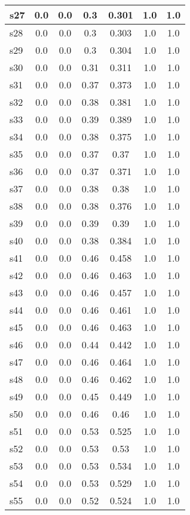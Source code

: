 \documentclass{article}
\begin{document}
\begin{tabular}{|l|c|c|c|c|c|c|}
s27 &0.0 & 0.0 & 0.3 & 0.301 & 1.0 & 1.0\\
\hline
s28 &0.0 & 0.0 & 0.3 & 0.303 & 1.0 & 1.0\\
\hline
s29 &0.0 & 0.0 & 0.3 & 0.304 & 1.0 & 1.0\\
\hline
s30 &0.0 & 0.0 & 0.31 & 0.311 & 1.0 & 1.0\\
\hline
s31 &0.0 & 0.0 & 0.37 & 0.373 & 1.0 & 1.0\\
\hline
s32 &0.0 & 0.0 & 0.38 & 0.381 & 1.0 & 1.0\\
\hline
s33 &0.0 & 0.0 & 0.39 & 0.389 & 1.0 & 1.0\\
\hline
s34 &0.0 & 0.0 & 0.38 & 0.375 & 1.0 & 1.0\\
\hline
s35 &0.0 & 0.0 & 0.37 & 0.37 & 1.0 & 1.0\\
\hline
s36 &0.0 & 0.0 & 0.37 & 0.371 & 1.0 & 1.0\\
\hline
s37 &0.0 & 0.0 & 0.38 & 0.38 & 1.0 & 1.0\\
\hline
s38 &0.0 & 0.0 & 0.38 & 0.376 & 1.0 & 1.0\\
\hline
s39 &0.0 & 0.0 & 0.39 & 0.39 & 1.0 & 1.0\\
\hline
s40 &0.0 & 0.0 & 0.38 & 0.384 & 1.0 & 1.0\\
\hline
s41 &0.0 & 0.0 & 0.46 & 0.458 & 1.0 & 1.0\\
\hline
s42 &0.0 & 0.0 & 0.46 & 0.463 & 1.0 & 1.0\\
\hline
s43 &0.0 & 0.0 & 0.46 & 0.457 & 1.0 & 1.0\\
\hline
s44 &0.0 & 0.0 & 0.46 & 0.461 & 1.0 & 1.0\\
\hline
s45 &0.0 & 0.0 & 0.46 & 0.463 & 1.0 & 1.0\\
\hline
s46 &0.0 & 0.0 & 0.44 & 0.442 & 1.0 & 1.0\\
\hline
s47 &0.0 & 0.0 & 0.46 & 0.464 & 1.0 & 1.0\\
\hline
s48 &0.0 & 0.0 & 0.46 & 0.462 & 1.0 & 1.0\\
\hline
s49 &0.0 & 0.0 & 0.45 & 0.449 & 1.0 & 1.0\\
\hline
s50 &0.0 & 0.0 & 0.46 & 0.46 & 1.0 & 1.0\\
\hline
s51 &0.0 & 0.0 & 0.53 & 0.525 & 1.0 & 1.0\\
\hline
s52 &0.0 & 0.0 & 0.53 & 0.53 & 1.0 & 1.0\\
\hline
s53 &0.0 & 0.0 & 0.53 & 0.534 & 1.0 & 1.0\\
\hline
s54 &0.0 & 0.0 & 0.53 & 0.529 & 1.0 & 1.0\\
\hline
s55 &0.0 & 0.0 & 0.52 & 0.524 & 1.0 & 1.0\\

\end{tabular}
\end{document}
